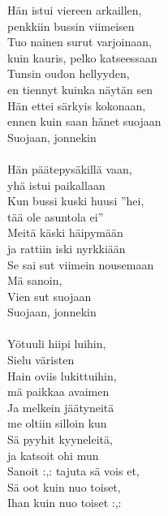 
        Hän istui viereen arkaillen, \\
        penkkiin bussin viimeisen \\
        Tuo nainen surut varjoinaan, \\
        kuin kauris, pelko katseessaan \\
        Tunsin oudon hellyyden, \\
        en tiennyt kuinka näytän sen \\
        Hän ettei särkyis kokonaan, \\
        ennen kuin saan hänet suojaan \\
        Suojaan, jonnekin \\
\hspace{10mm} \\
        Hän päätepysäkillä vaan, \\
        yhä istui paikallaan \\
        Kun bussi kuski huusi ”hei, \\
        tää ole asuntola ei” \\
        Meitä käski häipymään \\
        ja rattiin iski nyrkkiään \\
        Se sai sut viimein nousemaan \\
        Mä sanoin, \\
        Vien sut suojaan \\
        Suojaan, jonnekin \\
\hspace{10mm} \\
        Yötuuli hiipi luihin, \\
        Sielu väristen \\
        Hain oviis lukittuihin, \\
        mä paikkaa avaimen \\
        Ja melkein jäätyneitä \\
        me oltiin silloin kun \\
        Sä pyyhit kyyneleitä, \\
        ja katsoit ohi mun \\
        Sanoit :,: tajuta sä vois et, \\
        Sä oot kuin nuo toiset, \\
        Ihan kuin nuo toiset :,: \\
\hspace{10mm} \\
